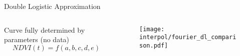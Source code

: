 
\begin{frame}[fragile]{Double Logistic Approximation}
    \begin{columns}
        \begin{column}{0.45\textwidth}
            Curve fully determined by parameters (no data)
            $$
                NDVI(t) = f(a,b,c,d,e)
            $$
            
        \end{column}
        \begin{column}{0.45\textwidth}
            \begin{figure}
                \texttt{[image: interpol/fourier\_dl\_comparison.pdf]}
            \end{figure}
        \end{column}
    \end{columns}
\end{frame}





